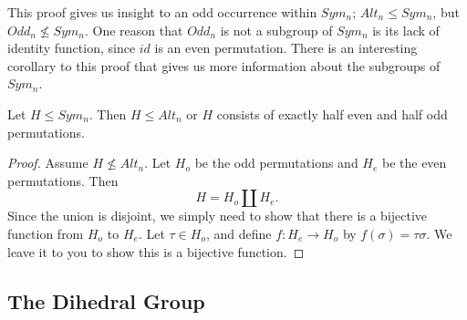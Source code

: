 This proof gives us insight to an odd occurrence within $Sym_{n}$; $Alt_{n}\leq Sym_{n}$, but $Odd_{n}\not\leq Sym_{n}$.
One reason that $Odd_{n}$ is not a subgroup of $Sym_{n}$ is its lack of identity function, since $id$ is an even permutation. There is an interesting corollary to this proof that gives us more information about the subgroups of $Sym_{n}$.

\begin{corollary}
	Let $H\leq Sym_{n}$. Then $H\leq Alt_{n}$ or $H$ consists of exactly half even and half odd permutations.
\end{corollary}
\begin{proof}
	Assume $H\not\leq Alt_{n}$. Let $H_{o}$ be the odd permutations and $H_{e}$ be the even permutations. Then
	\[
		H = H_{o} \coprod H_{e}.
	\]
 	Since the union is disjoint, we simply need to show that there is a bijective function from $H_{o}$ to $H_{e}$. Let $\tau\in H_{o}$, and define $f:H_{e}\to H_{o}$ by $f(\sigma)=\tau\sigma$. We leave it to you to show this is a bijective function.
\end{proof}

\subsection*{The Dihedral Group}

